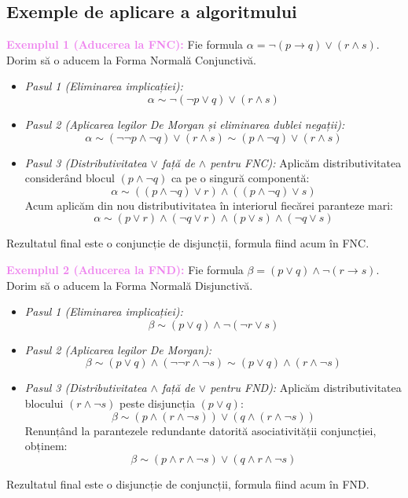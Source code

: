 \vspace{0.5cm}
\subsection*{Exemple de aplicare a algoritmului}

\noindent \textcolor{violet}{\textbf{Exemplul 1 (Aducerea la FNC):}} Fie formula $\alpha = \neg (p \rightarrow q) \lor (r \land s)$. Dorim să o aducem la Forma Normală Conjunctivă.

\begin{itemize}
	\item \textit{Pasul 1 (Eliminarea implicației):}
	      \[ \alpha \sim \neg (\neg p \lor q) \lor (r \land s) \]
	\item \textit{Pasul 2 (Aplicarea legilor De Morgan și eliminarea dublei negații):}
	      \[ \alpha \sim (\neg\neg p \land \neg q) \lor (r \land s) \sim (p \land \neg q) \lor (r \land s) \]
	\item \textit{Pasul 3 (Distributivitatea $\lor$ față de $\land$ pentru FNC):}
	      Aplicăm distributivitatea considerând blocul $(p \land \neg q)$ ca pe o singură componentă:
	      \[ \alpha \sim ((p \land \neg q) \lor r) \land ((p \land \neg q) \lor s) \]
	      Acum aplicăm din nou distributivitatea în interiorul fiecărei paranteze mari:
	      \[ \alpha \sim (p \lor r) \land (\neg q \lor r) \land (p \lor s) \land (\neg q \lor s) \]
\end{itemize}
Rezultatul final este o conjuncție de disjuncții, formula fiind acum în FNC.

\vspace{0.5cm}
\noindent \textcolor{violet}{\textbf{Exemplul 2 (Aducerea la FND):}} Fie formula $\beta = (p \lor q) \land \neg (r \rightarrow s)$. Dorim să o aducem la Forma Normală Disjunctivă.

\begin{itemize}
	\item \textit{Pasul 1 (Eliminarea implicației):}
	      \[ \beta \sim (p \lor q) \land \neg (\neg r \lor s) \]
	\item \textit{Pasul 2 (Aplicarea legilor De Morgan):}
	      \[ \beta \sim (p \lor q) \land (\neg\neg r \land \neg s) \sim (p \lor q) \land (r \land \neg s) \]
	\item \textit{Pasul 3 (Distributivitatea $\land$ față de $\lor$ pentru FND):}
	      Aplicăm distributivitatea blocului $(r \land \neg s)$ peste disjuncția $(p \lor q)$:
	      \[ \beta \sim (p \land (r \land \neg s)) \lor (q \land (r \land \neg s)) \]
	      Renunțând la parantezele redundante datorită asociativității conjuncției, obținem:
	      \[ \beta \sim (p \land r \land \neg s) \lor (q \land r \land \neg s) \]
\end{itemize}
Rezultatul final este o disjuncție de conjuncții, formula fiind acum în FND.
